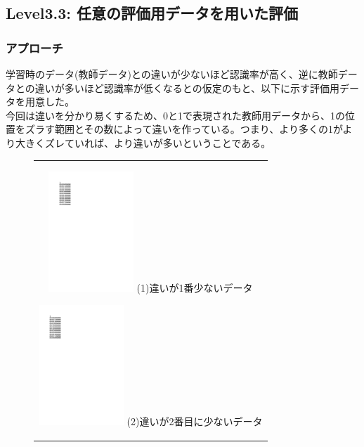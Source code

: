 \subsection{Level3.3: 任意の評価用データを用いた評価}
\subsubsection{アプローチ}
学習時のデータ(教師データ)との違いが少ないほど認識率が高く、逆に教師データとの違いが多いほど認識率が低くなるとの仮定のもと、以下に示す評価用データを用意した。\\
今回は違いを分かり易くするため、0と1で表現された教師用データから、1の位置をズラす範囲とその数によって違いを作っている。つまり、より多くの1がより大きくズレていれば、より違いが多いということである。
\begin{figure}[htbp]
  \begin{center}
    \begin{tabular}{c}

      \begin{minipage}{0.33\hsize}
        \begin{center}
          \includegraphics[clip, width=3.2cm]{./lebel3-3figs/eva1-3.pdf}
          \hspace{2.3cm} (1)違いが1番少ないデータ
        \end{center}
      \end{minipage}

      \begin{minipage}{0.33\hsize}
        \begin{center}
          \includegraphics[clip, width=3.2cm]{./lebel3-3figs/eva1-4.pdf}
          \hspace{2.3cm} (2)違いが2番目に少ないデータ
        \end{center}
      \end{minipage}


\end{tabular}
\end{center}
\end{figure}
